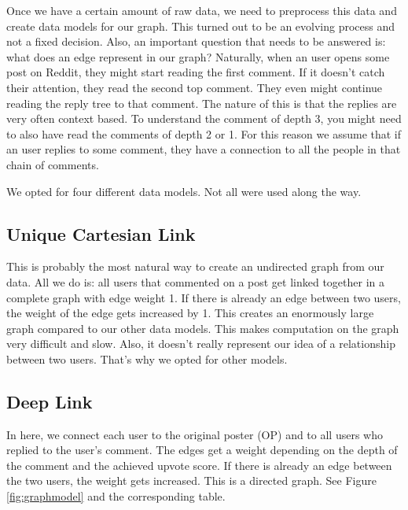 Once we have a certain amount of raw data, we need to preprocess this data and create data models for our graph. This turned out to be an evolving process and not a fixed decision. Also, an important question that needs to be answered is: what does an edge represent in our graph? Naturally, when an user opens some post on Reddit, they might start reading the first comment. If it doesn't catch their attention, they read the second top comment. They even might continue reading the reply tree to that comment. The nature of this is that the replies are very often context based. To understand the comment of depth 3, you might need to also have read the comments of depth 2 or 1. For this reason we assume that if an user replies to some comment, they have a connection to all the people in that chain of comments. 

We opted for four different data models. Not all were used along the way.

\subsection{Unique Cartesian Link}
This is probably the most natural way to create an undirected graph from our data. All we do is: all users that commented on a post get linked together in a complete graph with edge weight 1. If there is already an edge between two users, the weight of the edge gets increased by 1. This creates an enormously large graph compared to our other data models. This makes computation on the graph very difficult and slow. Also, it doesn't really represent our idea of a relationship between two users. That's why we opted for other models.

\subsection{Deep Link}
In here, we connect each user to the original poster (OP) and to all users who replied to the user's comment. The edges get a weight depending on the depth of the comment and the achieved upvote score. If there is already an edge between the two users, the weight gets increased. This is a directed graph. See Figure \ref{fig:graphmodel} and the corresponding table.

